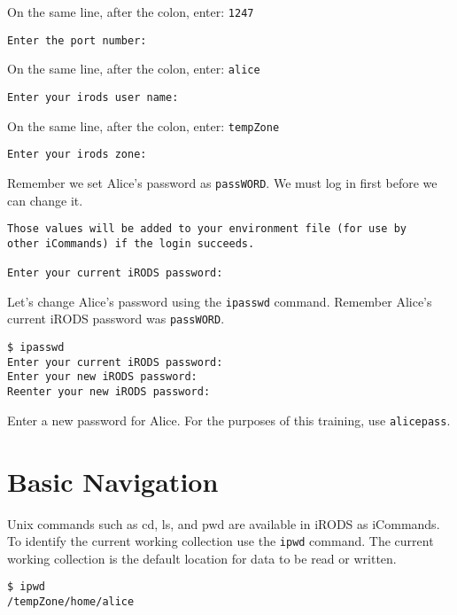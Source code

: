 \documentclass[10pt,oneside]{memoir}
\begin{document}
On the same line, after the colon, enter: \texttt{1247}

\begin{lstlisting}[basicstyle=\scriptsize\ttfamily]
Enter the port number:
\end{lstlisting}

On the same line, after the colon, enter: \texttt{alice}

\begin{lstlisting}[basicstyle=\scriptsize\ttfamily]
Enter your irods user name:
\end{lstlisting}

\newpage

On the same line, after the colon, enter: \texttt{tempZone}

\begin{lstlisting}[basicstyle=\scriptsize\ttfamily]
Enter your irods zone:
\end{lstlisting}

Remember we set Alice's password as \texttt{passWORD}. We must log in first before we can change it.

\begin{lstlisting}[basicstyle=\scriptsize\ttfamily]
Those values will be added to your environment file (for use by
other iCommands) if the login succeeds.

Enter your current iRODS password:
\end{lstlisting}


Let's change Alice's password using the \texttt{ipasswd} command. Remember Alice's current iRODS password was \texttt{passWORD}.

\begin{lstlisting}
$ ipasswd
Enter your current iRODS password:
Enter your new iRODS password:
Reenter your new iRODS password:
\end{lstlisting}

Enter a new password for Alice. For the purposes of this training, use \texttt{alicepass}.

\section{Basic Navigation}

Unix commands such as cd, ls, and pwd are available in iRODS as iCommands. To identify the current working collection use the \texttt{ipwd} command. The current working collection is the default location for data to be read or written.

\begin{lstlisting}
$ ipwd
/tempZone/home/alice
\end{lstlisting}
\end{document}
